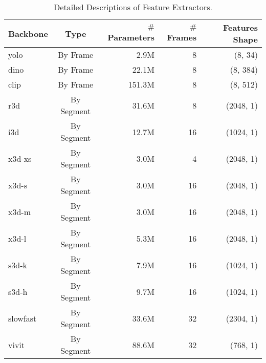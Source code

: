 \begin{table}[!h]
    \centering
    \small
    \begin{tabular}{lcrrr}
    \toprule
    Backbone & Type & $\#$Parameters & $\#$Frames & Features Shape \\
    \midrule
    yolo & By Frame & 2.9M & 8 & (8, 34) \\
    dino & By Frame & 22.1M & 8 & (8, 384) \\
    clip & By Frame & 151.3M & 8 & (8, 512) \\
    r3d & By Segment & 31.6M & 8 & (2048, 1) \\
    i3d & By Segment & 12.7M & 16 & (1024, 1) \\
    x3d-xs & By Segment & 3.0M & 4 & (2048, 1) \\
    x3d-s & By Segment & 3.0M & 16 & (2048, 1) \\
    x3d-m & By Segment & 3.0M & 16 & (2048, 1) \\
    x3d-l & By Segment & 5.3M & 16 & (2048, 1) \\
    s3d-k & By Segment & 7.9M & 16 & (1024, 1) \\
    s3d-h & By Segment & 9.7M & 16 & (1024, 1) \\
    slowfast & By Segment & 33.6M & 32 & (2304, 1) \\
    vivit & By Segment & 88.6M & 32 & (768, 1) \\
    \bottomrule
    \end{tabular}
    \vspace{-2ex}\caption{Detailed Descriptions of Feature Extractors.}
    \end{table}